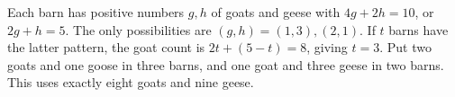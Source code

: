 Each barn has positive numbers $g,h$ of goats and geese with $4g+2h=10$, or $2g+h=5$. The only possibilities are $(g,h)=(1,3),(2,1)$. If $t$ barns have the latter pattern, the goat count is $2t+(5-t)=8$, giving $t=3$. Put two goats and one goose in three barns, and one goat and three geese in two barns. This uses exactly eight goats and nine geese.

